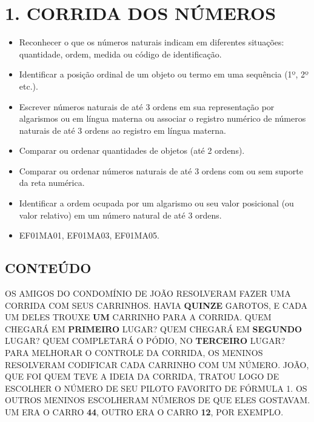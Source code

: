 \section{1. CORRIDA DOS
NÚMEROS}\label{muxf3dulo-1-corrida-dos-nuxfameros}



\begin{itemize}
\item
  Reconhecer o que os números naturais indicam em diferentes situações:
  quantidade, ordem, medida ou código de identificação.
\item
  Identificar a posição ordinal de um objeto ou termo em uma sequência
  (1º, 2º etc.).
\item
  Escrever números naturais de até 3 ordens em sua representação por
  algarismos ou em língua materna ou associar o registro numérico de
  números naturais de até 3 ordens ao registro em língua materna.
\item
  Comparar ou ordenar quantidades de objetos (até 2 ordens).
\item
  Comparar ou ordenar números naturais de até 3 ordens com ou sem
  suporte da reta numérica.
\item
  Identificar a ordem ocupada por um algarismo ou seu valor posicional
  (ou valor relativo) em um número natural de até 3 ordens.
\end{itemize}


\begin{itemize}
  \item EF01MA01, EF01MA03, EF01MA05.
\end{itemize}

\subsection{CONTEÚDO}\label{conteuxfado}

OS AMIGOS DO CONDOMÍNIO DE JOÃO RESOLVERAM FAZER UMA CORRIDA COM SEUS
CARRINHOS. HAVIA \textbf{QUINZE} GAROTOS, E CADA UM DELES TROUXE
\textbf{UM} CARRINHO PARA A CORRIDA. QUEM CHEGARÁ EM
\textbf{PRIMEIRO} LUGAR? QUEM CHEGARÁ EM \textbf{SEGUNDO}
LUGAR? QUEM COMPLETARÁ O PÓDIO, NO \textbf{TERCEIRO} LUGAR?
PARA MELHORAR O CONTROLE DA CORRIDA, OS MENINOS RESOLVERAM CODIFICAR
CADA CARRINHO COM UM NÚMERO. JOÃO, QUE FOI QUEM TEVE A IDEIA DA CORRIDA,
TRATOU LOGO DE ESCOLHER O NÚMERO DE SEU PILOTO FAVORITO DE FÓRMULA 1. OS
OUTROS MENINOS ESCOLHERAM NÚMEROS DE QUE ELES GOSTAVAM. UM ERA O CARRO
\textbf{44}, OUTRO ERA O CARRO \textbf{12}, POR EXEMPLO.

